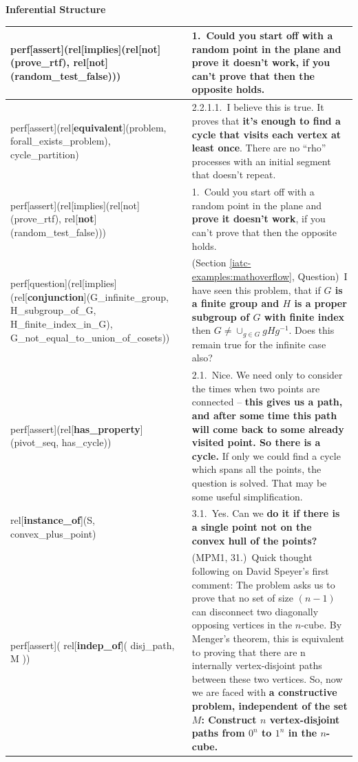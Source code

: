 \documentclass[smallextended,oneside]{svjour3}       %
\begin{document}
\newpage

{\centering
\textbf{Inferential Structure}  

\par}

\medskip

\noindent
\noindent\begin{tabular}{|p{}|p{}|}
\hline
perf[assert](rel[\textbf{implies}](rel[not](prove_rtf), rel[not](random_test_false))) & 1.~Could you start off with a random point in the plane and prove it doesn't work, \textbf{if you can't prove that then the opposite holds.}\\ \hline
perf[assert](rel[\textbf{equivalent}](problem, forall_exists_problem), cycle_partition) & 2.2.1.1.~I believe this is true. It proves that \textbf{it's enough to find a cycle that visits each vertex at least once}. There are no ``rho'' processes with an initial segment that doesn't repeat.\\ \hline
perf[assert](rel[implies](rel[not](prove_rtf), rel[\textbf{not}](random_test_false))) & 1.~Could you start off with a random point in the plane and \textbf{prove it doesn't work}, if you can't prove that then the opposite holds.\\ \hline
perf[question](rel[implies](rel[\textbf{conjunction}](G_infinite_group, H_subgroup_of_G, H_finite_index_in_G), G_not_equal_to_union_of_cosets)) & (Section \ref{iatc-examples:mathoverflow}, Question)~I have seen this problem, that if \textbf{$G$
is a finite group and $H$ is a proper subgroup of $G$ with finite index} then $ G \neq \cup_{g \in G} gHg^{-1}$. Does this remain true for the infinite case also? \\ \hline
 perf[assert](rel[\textbf{has_property}](pivot_seq, has_cycle)) & 2.1.~Nice. We need only to consider the times when two points are connected -- \textbf{this gives us a path, and after some time this path will come back to some already visited point. So there is a cycle.} If only we could find a cycle which spans all the points, the question is solved. That may be some useful simplification.\\ \hline
rel[\textbf{instance_of}](S, convex_plus_point) & 3.1.~Yes. Can we \textbf{do it if there is a single point not on the convex hull of the points?}\\ \hline
perf[assert]( rel[\textbf{indep_of}]( disj_path, M )) & (MPM1, 31.)~Quick thought following on David Speyer's first comment:  The problem asks us to prove that no set of size $(n-1)$ can disconnect two diagonally opposing vertices in the $n$-cube.  By Menger's theorem, this is equivalent to proving that there are n internally vertex-disjoint paths between these two vertices.  So, now we are faced with \textbf{a constructive problem, independent of the set $M$:  Construct $n$ vertex-disjoint paths from $0^n$ to $1^n$ in the $n$-cube.}\\ \hline

\end{tabular}
\end{document}
